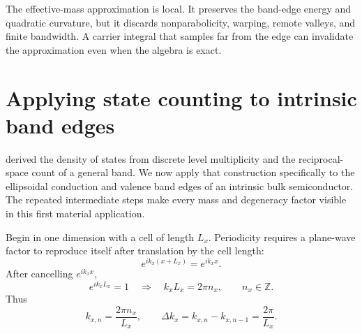 \begin{boundarybox}
The effective-mass approximation is local.  It preserves the band-edge energy
and quadratic curvature, but it discards nonparabolicity, warping, remote
valleys, and finite bandwidth.  A carrier integral that samples far from the
edge can invalidate the approximation even when the algebra is exact.
\end{boundarybox}

\section{Applying state counting to intrinsic band edges}

 derived the density of states from discrete
level multiplicity and the reciprocal-space count of a general band.  We now
apply that construction specifically to the ellipsoidal conduction and valence
band edges of an intrinsic bulk semiconductor.  The repeated intermediate
steps make every mass and degeneracy factor visible in this first material
application.

Begin in one dimension with a cell of length $L_x$.  Periodicity requires a
plane-wave factor to reproduce itself after translation by the cell length:
\begin{equation}
  e^{ik_x(x+L_x)}=e^{ik_xx}.
  \label{eq:periodic-plane-wave-condition}
\end{equation}
After cancelling $e^{ik_xx}$,
\begin{equation}
  e^{ik_xL_x}=1
  \quad\Longrightarrow\quad
  k_xL_x=2\pi n_x,
  \qquad n_x\in\mathbb Z.
  \label{eq:one-dimensional-k-quantization}
\end{equation}
Thus
\begin{equation}
  k_{x,n}=\frac{2\pi n_x}{L_x},
  \qquad
  \Delta k_x=k_{x,n}-k_{x,n-1}=\frac{2\pi}{L_x}.
  \label{eq:one-dimensional-k-spacing}
\end{equation}

